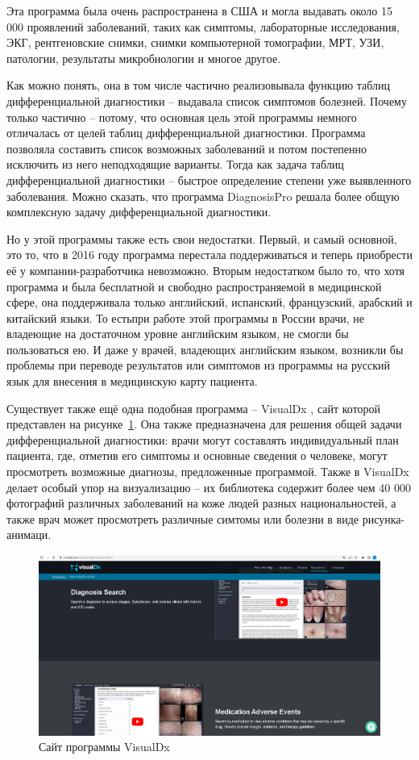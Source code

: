 Эта программа была очень распространена в США и могла выдавать около 15 000 проявлений заболеваний, таких как симптомы, лабораторные исследования, ЭКГ, рентгеновские снимки, снимки компьютерной томографии, МРТ, УЗИ, патологии, результаты микробиологии и многое другое. 

Как можно понять, она в том числе частично реализовывала функцию таблиц дифференциальной диагностики -- выдавала список симптомов болезней. Почему только частично -- потому, что основная цель этой программы немного отличалась от целей таблиц дифференциальной диагностики. Программа позволяла составить список возможных заболеваний и потом постепенно исключить из него неподходящие варианты. Тогда как задача таблиц дифференциальной диагностики -- быстрое определение степени уже выявленного заболевания. Можно сказать, что программа DiagnosisPro решала более общую комплексную задачу дифференциальной диагностики. 

Но у этой программы также есть свои недостатки. Первый, и самый основной, это то, что в 2016 году программа перестала поддерживаться и теперь приобрести её у компании-разработчика невозможно. Вторым недостатком было то, что хотя программа и была бесплатной и свободно распространяемой в медицинской сфере, она поддерживала только английский, испанский, французский, арабский и китайский языки. То естьпри работе этой программы в России врачи, не владеющие на достаточном уровне английским языком, не смогли бы пользоваться ею. И даже у врачей, владеющих английским языком, возникли бы проблемы при переводе результатов или симптомов из программы на русский язык для внесения в медицинскую карту пациента.

Существует также ещё одна подобная программа -- VisualDx \cite{visualdx}, сайт которой представлен на рисунке~\ref{fig:vdx}. Она также предназначена для решения общей задачи дифференциальной диагностики: врачи могут составлять индивидуальный план пациента, где, отметив его симптомы и основные сведения о человеке, могут просмотреть возможные диагнозы, предложенные программой. Также в VisualDx делает особый упор на визуализацию -- их библиотека содержит более чем 40 000 фотографий различных заболеваний на коже людей разных национальностей, а также врач может просмотреть различные симтомы или болезни в виде рисунка-анимаци.

\begin{figure}
  \includegraphics[scale=0.3]{src/VisDx.png}
  \caption{Сайт программы VisualDx}
  \label{fig:vdx}
\end{figure}

